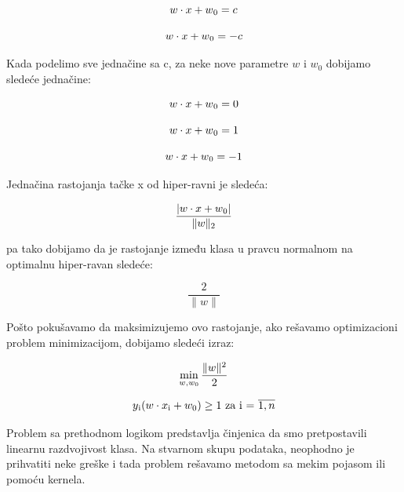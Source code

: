 \documentclass[12pt,oneside]{memoir}
\begin{document}
\begin{equation}
	w\cdot x+w\textsubscript{0} = c \\
\end{equation}

\begin{equation}
	w\cdot x+w\textsubscript{0} = -c
\end{equation}

{\setlength{\parindent}{0cm}
Kada podelimo sve jednačine sa c, za neke nove parametre $w$ i $w_0$ dobijamo sledeće jednačine:
}

\begin{equation}
	w\cdot x+w\textsubscript{0} = 0
\end{equation}

\begin{equation}
	w\cdot x+w\textsubscript{0} = 1
\end{equation}

\begin{equation}
	w\cdot x+w\textsubscript{0} = -1
\end{equation}

\noindent
Jednačina rastojanja tačke x od hiper-ravni je sledeća:

\begin{equation}
	\frac{|w \cdot x + w\textsubscript{0}|}{\|w\|\textsubscript{2}}
\end{equation}

\noindent
pa tako dobijamo da je rastojanje između klasa u pravcu normalnom na optimalnu hiper-ravan sledeće:

\begin{equation}
	\frac{2}{\|w\|}
\end{equation}

\newpage
\noindent
Pošto pokušavamo da maksimizujemo ovo rastojanje, ako rešavamo optimizacioni problem minimizacijom, dobijamo sledeći izraz:

\begin{equation}
	\min_{w,w_0} \frac{\|w\|^{2}}{2} \\
\end{equation}

\begin{equation}
	y\textsubscript{i}(w \cdot x\textsubscript{i} + w_0) \geq 1 \text{ za i = } \overline{1,n}
\end{equation}

\noindent
Problem sa prethodnom logikom predstavlja činjenica da smo pretpostavili linearnu razdvojivost klasa. Na stvarnom skupu podataka, neophodno je prihvatiti neke greške i tada problem rešavamo metodom sa mekim pojasom ili pomoću kernela.
\end{document}
